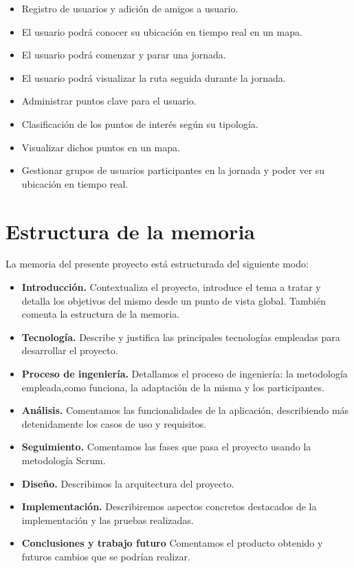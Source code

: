 \begin{itemize}
\item Registro de usuarios y adición de amigos a usuario.
\item El usuario podrá conocer su ubicación en tiempo real en un mapa.
\item El usuario podrá comenzar y parar una jornada.
\item El usuario podrá visualizar la ruta seguida durante la jornada.
\item Administrar puntos clave para el usuario.
\item Clasificación de los puntos de interés según su tipología.
\item Visualizar dichos puntos en un mapa.
\item Gestionar grupos de usuarios participantes en la jornada y poder ver su ubicación en tiempo
real.

\end{itemize}


\section{Estructura de la memoria}
La memoria del presente proyecto está estructurada del siguiente modo:

\begin{itemize}
\item \textbf{Introducción.} Contextualiza el proyecto, introduce el tema a tratar y detalla los objetivos del mismo desde un punto de vista global.
 También comenta la estructura de la memoria.

\item \textbf{Tecnología.} Describe y justifica las principales tecnologías empleadas para desarrollar el proyecto.



\item \textbf{Proceso de ingeniería.} Detallamos el proceso de ingeniería: la metodología empleada,como funciona, la adaptación de la misma y los participantes.


\item \textbf{Análisis.} Comentamos las funcionalidades de la aplicación, describiendo más detenidamente los casos de uso y requisitos. 
\item \textbf{Seguimiento.} Comentamos las fases que pasa el proyecto usando la metodología Scrum.
\item \textbf{Diseño.} Describimos la arquitectura del proyecto.
\item \textbf{Implementación.} Describiremos aspectos concretos destacados de la implementación y las pruebas realizadas.





\item \textbf{Conclusiones y trabajo futuro}
Comentamos el producto obtenido y futuros cambios que se podrían realizar.



\end{itemize}

